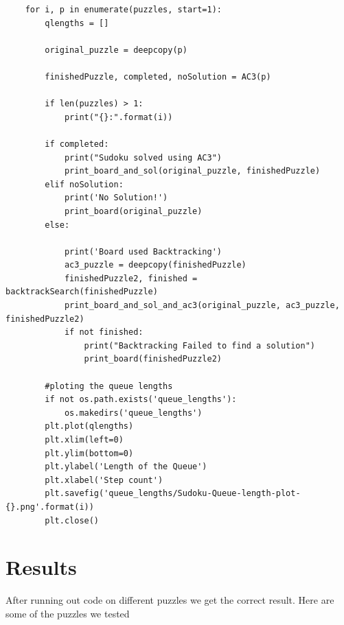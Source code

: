 \documentclass{article}
\begin{document}
\begin{verbatim}
    for i, p in enumerate(puzzles, start=1):
        qlengths = []
        
        original_puzzle = deepcopy(p)

        finishedPuzzle, completed, noSolution = AC3(p)

        if len(puzzles) > 1:
            print("{}:".format(i))

        if completed:
            print("Sudoku solved using AC3")
            print_board_and_sol(original_puzzle, finishedPuzzle)
        elif noSolution:
            print('No Solution!')
            print_board(original_puzzle)
        else:

            print('Board used Backtracking')
            ac3_puzzle = deepcopy(finishedPuzzle)
            finishedPuzzle2, finished = backtrackSearch(finishedPuzzle)
            print_board_and_sol_and_ac3(original_puzzle, ac3_puzzle, finishedPuzzle2)
            if not finished:
                print("Backtracking Failed to find a solution")
                print_board(finishedPuzzle2)

        #ploting the queue lengths
        if not os.path.exists('queue_lengths'):
            os.makedirs('queue_lengths')
        plt.plot(qlengths)
        plt.xlim(left=0)
        plt.ylim(bottom=0)
        plt.ylabel('Length of the Queue')
        plt.xlabel('Step count')
        plt.savefig('queue_lengths/Sudoku-Queue-length-plot-{}.png'.format(i))
        plt.close()
\end{verbatim}

\section{Results}

After running out code on different puzzles we get the correct result. Here are some of the puzzles we tested
\end{document}
